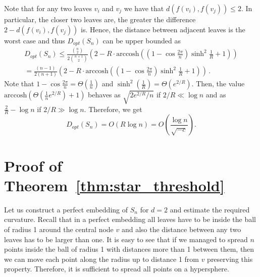 \documentclass[runningheads]{llncs}
\begin{document}
Note that for any two leaves $v_i$ and $v_j$ we have that $d(f(v_i), f(v_j)) \le 2$. In particular, the closer two leaves are, the greater the difference $2 - d(f(v_i), f(v_j))$ is. Hence, the distance between adjacent leaves is the worst case and thus $D_{opt}(S_n)$ can be upper bounded as
\begin{multline*}
D_{opt}(S_n) \le \frac{{n \choose 2}}{2{n+1\choose 2}} \left(2 - R\cdot \mathrm{arccosh}\left( \left(1 - \cos \frac{2 \pi}{n}\right)\sinh^2\frac{1}{R}  + 1 \right)\right) \\
= \frac{(n-1)}{2(n+1)} \left(2 - R\cdot \mathrm{arccosh}\left( \left(1 - \cos \frac{2 \pi}{n}\right)\sinh^2\frac{1}{R}  + 1 \right)\right)\,.
\end{multline*}
Note that $1 - \cos\frac{2\pi}{n} = \Theta\left(\frac{1}{n}\right)$ and $\sinh^2\left(\frac{1}{R}\right) = \Theta\left(e^{2/R}\right)$.
Then, the value $\textrm{arccosh}\left(\Theta\left(\frac{1}{n} e^{2/R}\right) + 1 \right)$ behaves as $\sqrt{2e^{2/R}/n}$ if $2/R \ll \log n$ and as $\frac{2}{R} - \log n$ if $2/R \gg \log n$.
Therefore, we get
\[
D_{opt}(S_n) = O\left( R \log n \right) = O\left( \frac{\log n}{\sqrt{-c}} \right).
\]



\section{Proof of Theorem~\ref{thm:star_threshold}}\label{app:proof:star_threshold}

Let us construct a perfect embedding of $S_n$ for $d = 2$
and estimate the required curvature.
Recall that in a perfect embedding all leaves have to be inside the ball of radius 1 around the central node $v$ and also the distance between any two leaves has to be larger than one. 
It is easy to see that if we managed to spread $n$ points inside the ball of radius 1 with distances more than 1 between them, then we can move each point along the radius up to distance 1 from $v$ preserving this property. Therefore, it is sufficient to spread all points on a hypersphere.
\end{document}

